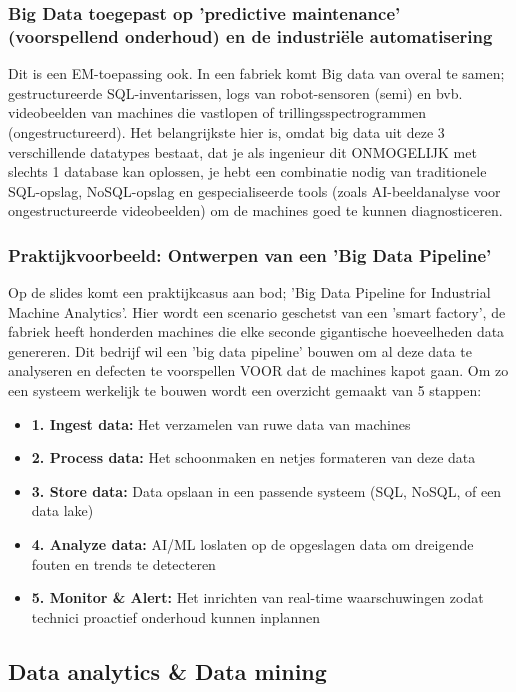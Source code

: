 \documentclass[a4paper,11pt,twoside]{report}
\begin{document}
\subsubsection{Big Data toegepast op 'predictive maintenance' (voorspellend onderhoud) en de
industriële automatisering}
Dit is een EM-toepassing ook. In een fabriek komt Big data van overal te samen; gestructureerde
SQL-inventarissen, logs van robot-sensoren (semi) en bvb. videobeelden van machines die vastlopen of
trillingsspectrogrammen (ongestructureerd). Het belangrijkste hier is, omdat big data uit deze 3
verschillende datatypes bestaat, dat je als ingenieur dit ONMOGELIJK met slechts 1 database kan
oplossen, je hebt een combinatie nodig van traditionele SQL-opslag, NoSQL-opslag en gespecialiseerde
tools (zoals AI-beeldanalyse voor ongestructureerde videobeelden) om de machines goed te kunnen
diagnosticeren.
\subsubsection{Praktijkvoorbeeld: Ontwerpen van een 'Big Data Pipeline'}
Op de slides komt een praktijkcasus aan bod; 'Big Data Pipeline for Industrial Machine Analytics'.
Hier wordt een scenario geschetst van een 'smart factory', de fabriek heeft honderden machines die
elke seconde gigantische hoeveelheden data genereren. Dit bedrijf wil een 'big data pipeline' bouwen
om al deze data te analyseren en defecten te voorspellen VOOR dat de machines kapot gaan.
\newline
\newline
Om zo een systeem werkelijk te bouwen wordt een overzicht gemaakt van 5 stappen:
\begin{itemize}
    \item \textbf{1. Ingest data:} Het verzamelen van ruwe data van machines
    \item \textbf{2. Process data:} Het schoonmaken en netjes formateren van deze data
    \item \textbf{3. Store data:} Data opslaan in een passende systeem (SQL, NoSQL, of een data
    lake)
    \item \textbf{4. Analyze data:} AI/ML loslaten op de opgeslagen data om dreigende fouten en
    trends te detecteren
    \item \textbf{5. Monitor \& Alert:} Het inrichten van real-time waarschuwingen zodat technici
    proactief onderhoud kunnen inplannen
\end{itemize}
\subsection{Data analytics \& Data mining}
\end{document}
